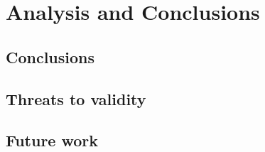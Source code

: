 \chapter{Analysis and Conclusions}
\label{analysis}

\section{Conclusions}

\section{Threats to validity}
\begin{comment}
* Is the Ohloh database a representation of the world of OSS projects?
* Is LOC as the sum of source lines of code, comments, and blank lines valid?
* The use of LOC as a measure of project evolution. Does it represent
activity/growth/whatever to say something about the project's status?
* A selection criterion for the projects was a continuous series of subsequent
monthly facts. Maybe the full series of evolution data of a project is needed in
order to find objective signs or to be able to compare different projects.
* Is 250 projects enough to detect patterns and generalise to the world of OSS
projects?
* Is monthly aggregated data fine-grained enough?

\end{comment}

\section{Future work}


\begin{comment}
This chapter contains the analysis and interpretation of the results. The
research questions are answered as best as possible given the results that were
obtained. The analysis also discussed parts of the questions that were left
unanswered.
An important topic is the validity of the results. What methods of validation
were used? Could the results be generalized to other cases? What threats to
validity can be identified? There is room here to discuss the results of
related scientific literature here as well. How do the results obtained here
relate to other work, and what consequences are there? Did your approach work
better or worse? Did you learn anything new compared to the already existing
body of knowledge? Finally, what could you say in hindsight on the research
approach by followed? What could have done better? What lessons have been
learned? What could other researchers use from your experience? A separate
section should be devoted to ‘future work,’ i.e., possible extension points of
your work that you have identified. Other researchers (or yourself) could use
those as a starting point.
Refer to Chapters 3.7 and 4 in this example thesis at Paul’s
homepage\footnote{http://homepages.cwi.nl/~paulk/thesesMasterSoftwareEngineering/2006/ReneWiegers.pdf}.
\end{comment}
